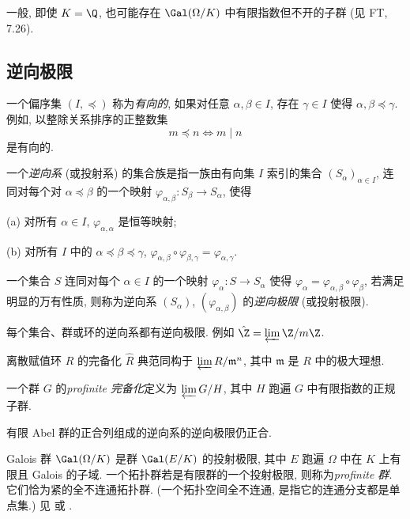 \begin{remark}\label{rem:A.6}
一般, 即使 $K=\Q$, 也可能存在 $\Gal(\Omega/K)$ 中有限指数但不开的子群 (见 FT, 7.26).
\end{remark}

\subsection*{逆向极限}

一个偏序集 $(I,\preceq)$ 称为\emph{有向的}, 如果对任意 $\alpha,\beta\in I$, 存在 $\gamma\in I$ 使得 $\alpha,\beta\preceq\gamma$. 例如, 以整除关系排序的正整数集
\[
m\preceq n\iff m\mid n
\]
是有向的.

一个\emph{逆向系} (或投射系) 的集合族是指一族由有向集 $I$ 索引的集合 $(S_{\alpha})_{\alpha\in I}$, 连同对每个对 $\alpha\preceq\beta$ 的一个映射 $\varphi_{\alpha,\beta}\colon S_{\beta}\to S_{\alpha}$, 使得

(a) 对所有 $\alpha\in I$, $\varphi_{\alpha,\alpha}$ 是恒等映射;

(b) 对所有 $I$ 中的 $\alpha\preceq\beta\preceq\gamma$, $\varphi_{\alpha,\beta}\circ\varphi_{\beta,\gamma}=\varphi_{\alpha,\gamma}$.

一个集合 $S$ 连同对每个 $\alpha\in I$ 的一个映射 $\varphi_{\alpha}\colon S\to S_{\alpha}$ 使得 $\varphi_{\alpha}=\varphi_{\alpha,\beta}\circ\varphi_{\beta}$, 若满足明显的万有性质, 则称为逆向系 $(S_{\alpha})$, $(\varphi_{\alpha,\beta})$ 的\emph{逆向极限} (或投射极限).

每个集合、群或环的逆向系都有逆向极限. 例如 $\hat{\Z}=\varprojlim\Z/m\Z$.

\begin{example}\label{ex:A.7}
离散赋值环 $R$ 的完备化 $\hat{R}$ 典范同构于 $\varprojlim R/\mathfrak{m}^n$, 其中 $\mathfrak{m}$ 是 $R$ 中的极大理想.
\end{example}

一个群 $G$ 的\emph{profinite 完备化}定义为 $\varprojlim G/H$, 其中 $H$ 跑遍 $G$ 中有限指数的正规子群.

\begin{proposition}\label{prop:A.8}
有限 Abel 群的正合列组成的逆向系的逆向极限仍正合.
\end{proposition}

\begin{remark}\label{rem:A.9}
Galois 群 $\Gal(\Omega/K)$ 是群 $\Gal(E/K)$ 的投射极限, 其中 $E$ 跑遍 $\Omega$ 中在 $K$ 上有限且 Galois 的子域. 一个拓扑群若是有限群的一个投射极限, 则称为\emph{profinite 群}. 它们恰为紧的全不连通拓扑群. (一个拓扑空间全不连通, 是指它的连通分支都是单点集.) 见 \cite{Serre1964} 或 \cite{Shatz1972}.
\end{remark}

\renewcommand{\thetheorem}{\thesection.\arabic{theorem}}

